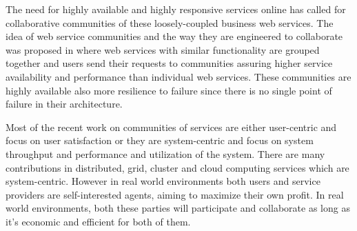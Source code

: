 \documentclass[10pt, conference, compsocconf]{IEEEtran}
\theoremstyle{plain}
\theoremstyle{definition}
\begin{document}
The need for highly available and highly responsive services online has called for collaborative communities of these loosely-coupled business web services. The idea of web service communities and the way they are engineered to collaborate was proposed in \cite{DBLP:journals/ijebr/MaamarSTBB09, DBLP:journals/internet/BenatallahSD03, Rosario:2008:PQS:1512146.1512290} where web services with similar functionality are grouped together and users send their requests to communities assuring higher service availability and performance than individual web services. These communities are highly available also more resilience to failure since there is no single point of failure in their architecture. 

Most of the recent work on communities of services are either user-centric and focus on user satisfaction \cite{Chun02user-centricperformance} or they are system-centric and focus on system throughput and performance and utilization of the system. There are many contributions in distributed, grid, cluster and cloud computing services which are system-centric. However in real world environments both users and service providers are self-interested agents, aiming to maximize their own profit. In real world environments, both these parties will participate and collaborate as long as it's economic and efficient for both of them.
\end{document}
